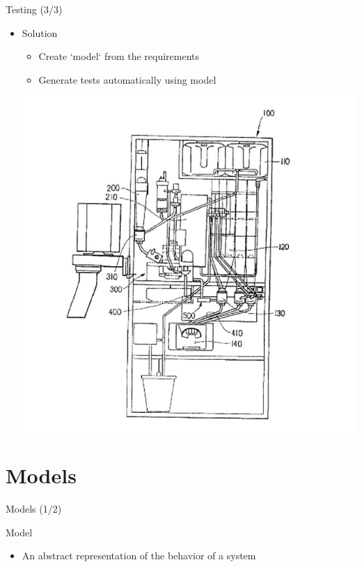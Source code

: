 \documentclass{FMTslides}
\begin{document}
\begin{frame}{Testing (3/3)}
\begin{itemize}
  \item Solution
  \begin{itemize}
    \item Create `model` from the requirements
    \item Generate tests automatically using model
  \end{itemize}
  \begin{center}
    \includegraphics[scale=0.20]{./figures/abstract_coffee_machine.png}
  \end{center}
\end{itemize}
\end{frame}

\section{Models}

\begin{frame}{Models (1/2)}
\begin{block}{Model}
\begin{itemize}
  \item An abstract representation of the behavior of a system
\end{itemize}
\end{block}
\begin{figure}

\end{figure}
\end{frame}
\end{document}
